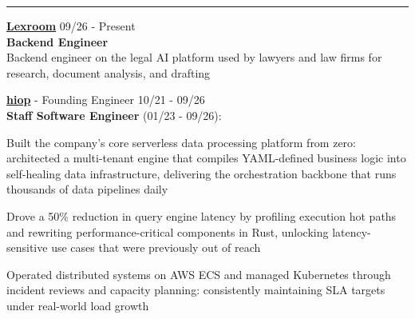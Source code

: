 \documentclass[10pt,letterpaper]{article}
\begin{document}
\begin{justify}
      \hrule
      \begin{itemize}[label={}, leftmargin=0pt]
            \begin{item}
                  {\fontsize{10.5pt}{13pt}\selectfont \textbf{\href{https://www.lexroom.ai/}{Lexroom}}}
                  \hfill
                  \small{09/26 - Present}
                  \\
                  \small{\textbf{Backend Engineer}}
                  \\
                  Backend engineer on the legal AI platform used by lawyers and law firms
                  for research, document analysis, and drafting
            \end{item}
            \vspace{0.05cm}
            \begin{item}
                  {\fontsize{10.5pt}{13pt}\selectfont \textbf{\href{https://hiop.io/}{hiop}}} {\small - Founding Engineer}
                  \hfill
                  \small{10/21 - 09/26}
                  \\
                  \small{\textbf{Staff Software Engineer} (01/23 - 09/26)}:
                  \vspace{-0.15cm}
                  \begin{itemize}[label={$\bullet$}, leftmargin=12.5pt, noitemsep]
                        \begin{item}
                              Built the company's core serverless data processing platform from zero:
                              architected a multi-tenant engine that compiles YAML-defined business
                              logic into self-healing data infrastructure,
                              delivering the orchestration backbone that runs thousands of data pipelines daily
                        \end{item}
                        \begin{item}
                              Drove a 50\% reduction in query engine latency by profiling execution hot paths and rewriting performance-critical components in Rust,
                              unlocking latency-sensitive use cases that were previously out of reach
                        \end{item}
                        \begin{item}
                              Operated distributed systems on AWS ECS and managed Kubernetes through
                              incident reviews and capacity planning: consistently maintaining SLA targets under real-world load growth

\end{item}
\end{itemize}
\end{item}
\end{itemize}
\end{justify}
\end{document}
